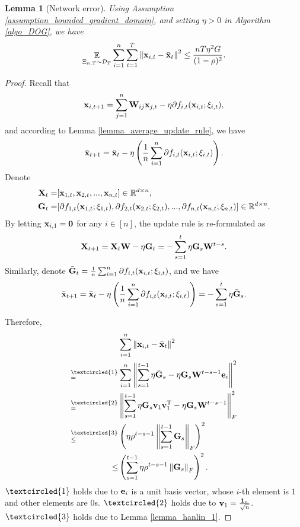 \documentclass{article}
\newtheorem{Lemma}{\bf{Lemma}}
\begin{document}
\begin{Lemma}[Network error]
\label{lemma_x_variance_norm_square}
Using Assumption \ref{assumption_bounded_gradient_domain}, and setting $\eta>0$ in Algorithm \ref{algo_DOG}, we have 
\begin{align}
\nonumber
\mathop{\mathbb{E}}_{ \Xi_{n,T} \sim \mathcal{D}_{T} } \sum_{i=1}^n\sum_{t=1}^T \left\lVert{\bf x}_{i,t} - \bar{{\bf x}}_t\right\rVert^2 \le \frac{nT\eta^2 G }{(1-\rho)^2}.
\end{align}

\end{Lemma}
\begin{proof}


Recall that 
\begin{align}
\nonumber
{\bf x}_{i,t+1} = \sum_{j=1}^n {\bf W}_{ij}{\bf x}_{j,t} - \eta \partial f_{i,t}({\bf x}_{i,t};\xi_{i,t}), 
\end{align} and according to Lemma \ref{lemma_average_update_rule}, we have 
\begin{align}
\nonumber
\bar{{\bf x}}_{t+1} = \bar{{\bf x}}_t - \eta \left( \frac{1}{n}\sum_{i=1}^n \partial f_{i,t}({\bf x}_{i,t};\xi_{i,t}) \right).
\end{align} Denote 
\begin{align}
\nonumber
{\bf X}_t = &  [{\bf x}_{1,t}, {\bf x}_{2,t}, ..., {\bf x}_{n,t}] \in \mathbb{R}^{d\times n}, \\ \nonumber
{\bf G}_t = & [\partial f_{1,t}({\bf x}_{1,t};\xi_{1,t}), \partial f_{2,t}({\bf x}_{2,t};\xi_{2,t}), ..., \partial f_{n,t}({\bf x}_{n,t};\xi_{n,t})] \in \mathbb{R}^{d\times n}.
\end{align} By letting ${\bf x}_{i,1} = {\bf 0}$ for any $i\in[n]$, the update rule is re-formulated as 
\begin{align}
\nonumber
{\bf X}_{t+1} = {\bf X}_t {\bf W} - \eta {\bf G}_t = - \sum_{s=1}^t \eta {\bf G}_s {\bf W}^{t-s}. 
\end{align} Similarly, denote $\bar{{\bf G}}_t = \frac{1}{n}\sum_{i=1}^n \partial f_{i,t}({\bf x}_{i,t};\xi_{i,t})$, and we have
\begin{align}
\bar{{\bf x}}_{t+1} = \bar{{\bf x}}_t - \eta \left( \frac{1}{n}\sum_{i=1}^n \partial f_{i,t}({\bf x}_{i,t};\xi_{i,t}) \right) = - \sum_{s=1}^t \eta \bar{{\bf G}}_s. 
\end{align}


Therefore, 
\begin{align}
\nonumber
& \sum_{i=1}^n \lrnorm{\x_{i,t} - \bar{\x}_t}^2 \\ \nonumber
\refabovecir{=}{\textcircled{1}} & \sum_{i=1}^n \lrnorm{ \sum_{s=1}^{t-1} \eta \bar{\G}_s - \eta \G_s \W^{t-s-1}\e_i }^2   \\ \nonumber
\refabovecir{=}{\textcircled{2}} & \lrnorm{ \sum_{s=1}^{t-1} \eta \G_s\v_1 \v_1\Tr - \eta \G_s \W^{t-s-1} }^2_F   \\ \nonumber
\refabovecir{\le}{\textcircled{3}} & \lrincir{ \eta \rho^{t-s-1} \lrnorm{\sum_{s=1}^{t-1}\G_s}_F}^2 \\ \nonumber
\le & \lrincir{ \sum_{s=1}^{t-1} \eta \rho^{t-s-1} \lrnorm{\G_s}_F}^2.
\end{align} $\textcircled{1}$ holds due to ${\bf e}_i$ is a unit basis vector, whose $i$-th element is $1$ and other elements are $0$s. $\textcircled{2}$ holds due to ${\bf v}_1 = \frac{{\bf 1}_n}{\sqrt{n}}$. $\textcircled{3}$ holds due to Lemma \ref{lemma_hanlin_1}. 



\end{proof}
\end{document}
